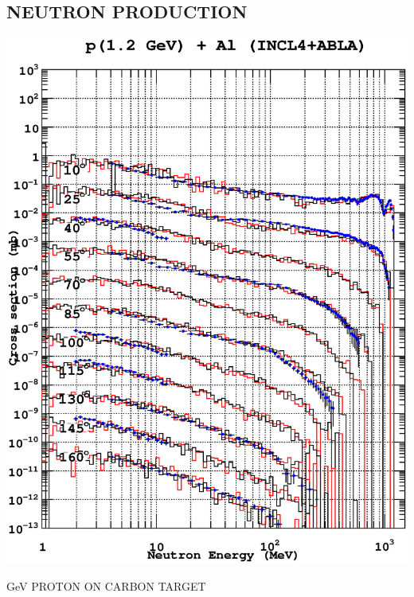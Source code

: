 \documentclass[20pt]{article}
\begin{document}
\begin{center}
\begin{multicols}{3}
\section*{{\Huge {\sf NEUTRON PRODUCTION}}}
\vspace{-1cm}
\begin{center}
\includegraphics[scale=0.69]{images/aluminum.eps}
\end{center}

\vspace{5cm}
\begin{center}
{\Huge { GeV PROTON  ON CARBON TARGET}}


\end{center}
\end{multicols}
\end{center}
\end{document}
